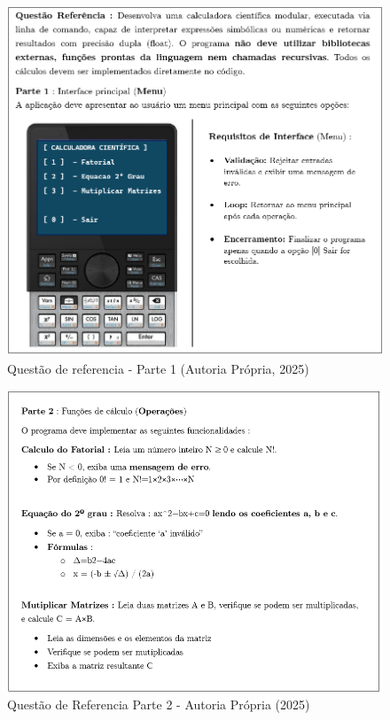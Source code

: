 \begin{figure}[ht]
	\centering
	\includegraphics[width=12cm]{./imagens/capitulo4/questao-referencia-1.png}
	\caption{Questão de referencia - Parte 1 (Autoria Própria, 2025)}
	\label{fig:questao-referencia-part-2}
\end{figure}


\begin{figure}[ht]
    \centering
    \includegraphics[width=12cm]{./imagens/capitulo4/questao-referencia-2.png}
    \caption{Questão de Referencia Parte 2 - Autoria Própria (2025)}
    \label{fig:questao-referencia-part-2}
\end{figure}

